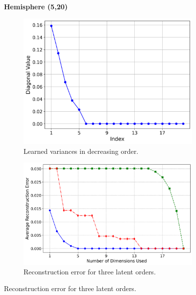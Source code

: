     \begin{figure}[t!]
        \vspace{-0.5cm}
            \centering
            \textbf{Hemisphere (5,20)} \par\medskip
            
            \begin{subfigure}[b]{0.443\textwidth}
                \centering
                \includegraphics[width=\textwidth]{chapter5/results/visualisations/RAE/reconstruction/hemisphere_5_20/diagonal_values_normal_scale.png}
                \caption{Learned variances in decreasing order.}
                \label{fig:hemisphere_variances}
            \end{subfigure}
            \hfill
            \begin{subfigure}[b]{0.546\textwidth}
                \centering
                \includegraphics[width=\textwidth]{chapter5/results/visualisations/RAE/reconstruction/hemisphere_5_20/reconstruction_error_plot_normal_scale.png}
                \caption{Reconstruction error for three latent orders.}
                \label{fig:hemisphere_reconstruction_errors}
            \end{subfigure}
            

\end{figure}
